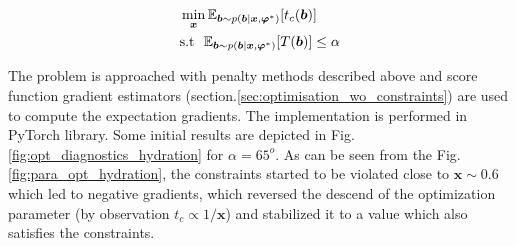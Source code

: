 \documentclass[a4paper,11pt]{article}
\begin{document}
\begin{align}
&\min_{\bm x} \mathbb{E}_{\bm b\sim p(\bm b | \bm x, \bm {\varphi}^*)}[t_c(\bm b)]\\
&\text{s.t} ~~ \mathbb{E}_{\bm b\sim p(\bm b | \bm x, \bm {\varphi}^*)}[T(\bm b)] \leq \alpha
\end{align}

The problem is approached with penalty methods described above and score function gradient estimators (section.\ref{sec:optimisation_wo_constraints}) \cite{schulman_gradient_2016} are used to compute the expectation gradients. The implementation is performed in PyTorch library.
Some initial results are depicted in Fig. \ref{fig:opt_diagnostics_hydration} for $\alpha = 65^o$. As can be seen from the Fig. \ref{fig:para_opt_hydration}, the constraints started to be violated close to $\bm x \sim 0.6$ which led to negative gradients, which reversed the descend of the optimization parameter (by observation $t_c \propto 1/\bm{x}$) and stabilized it to a value which also satisfies the constraints.
\end{document}
